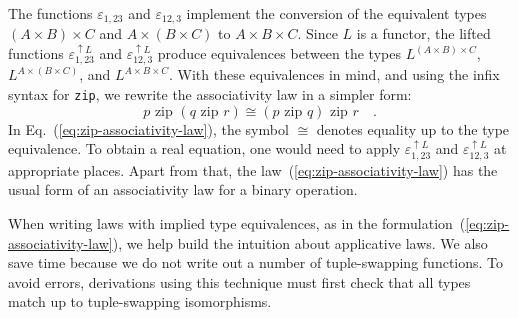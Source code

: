 The functions $\varepsilon_{1,23}$ and $\varepsilon_{12,3}$ implement
the conversion of the equivalent types $(A\times B)\times C$ and
$A\times(B\times C)$ to $A\times B\times C$. Since $L$ is a functor,
the lifted functions $\varepsilon_{1,23}^{\uparrow L}$ and $\varepsilon_{12,3}^{\uparrow L}$
produce equivalences between the types $L^{(A\times B)\times C}$,
$L^{A\times(B\times C)}$, and $L^{A\times B\times C}$. With these
equivalences in mind, and using the infix syntax for \lstinline!zip!,
we rewrite the associativity law in a simpler form:
\begin{equation}
p\,\,\text{zip}\,\,(q\,\,\text{zip}\,\,r)\cong(p\,\,\text{zip}\,\,q)\,\,\text{zip}\,\,r\quad.\label{eq:zip-associativity-law}
\end{equation}
In Eq.~(\ref{eq:zip-associativity-law}), the symbol $\cong$ denotes
equality up to the type equivalence. To obtain a real equation, one
would need to apply $\varepsilon_{1,23}^{\uparrow L}$ and $\varepsilon_{12,3}^{\uparrow L}$
at appropriate places. Apart from that, the law~(\ref{eq:zip-associativity-law})
has the usual form of an associativity law for a binary operation.

When writing laws with implied type equivalences, as in the formulation~(\ref{eq:zip-associativity-law}),
we help build the intuition about applicative laws. We also save time
because we do not write out a number of tuple-swapping functions.
To avoid errors, derivations using this technique must first check
that all types match up to tuple-swapping isomorphisms.

